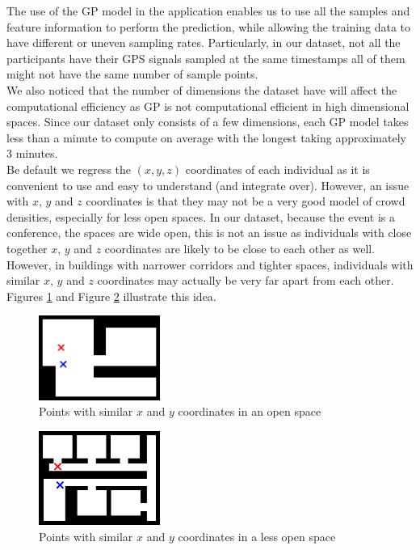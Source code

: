 \documentclass[letterpaper]{article}
\begin{document}
The use of the GP model in the application enables us to use all the samples and feature information to perform the prediction, while allowing the training data to have different or uneven sampling rates. Particularly, in our dataset, not all the participants have their GPS signals sampled at the same timestamps all of them might not have the same number of sample points. \\

We also noticed that the number of dimensions the dataset have will affect the computational efficiency as GP is not computational efficient in high dimensional spaces. Since our dataset only consists of a few dimensions, each GP model takes less than a minute to compute on average with the longest taking approximately 3 minutes.\\

Be default we regress the $(x,y,z)$ coordinates of each individual as it is convenient to use and easy to understand (and integrate over). However, an issue with $x$, $y$ and $z$ coordinates is that they may not be a very good model of crowd densities, especially for less open spaces. In our dataset, because the event is a conference, the spaces are wide open, this is not an issue as individuals with close together $x$, $y$ and $z$ coordinates are likely to be close to each other as well. However, in buildings with narrower corridors and tighter spaces, individuals with similar $x$, $y$ and $z$ coordinates may actually be very far apart from each other. Figures \ref{fig:opspace1} and Figure \ref{fig:opspace2} illustrate this idea.

\begin{figure}[h!]
  \centering
    \includegraphics[width=150px,natwidth=634,natheight=442]{openspace1.png}
  \caption{Points with similar $x$ and $y$ coordinates in an open space}
  \label{fig:opspace1}
\end{figure}

\begin{figure}[h!]
  \centering
    \includegraphics[width=150px,natwidth=570,natheight=442]{openspace2.png}
  \caption{Points with similar $x$ and $y$ coordinates in a less open space}
  \label{fig:opspace2}
\end{figure}
\end{document}
